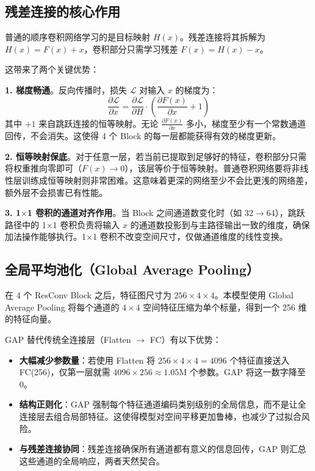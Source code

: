 \documentclass[12pt,a4paper]{ctexart}
\begin{document}
\subsection{残差连接的核心作用}

普通的顺序卷积网络学习的是目标映射 $H(x)$。残差连接将其拆解为 $H(x) = F(x) + x$，卷积部分只需学习残差 $F(x) = H(x) - x$。

这带来了两个关键优势：

\textbf{1. 梯度畅通}。反向传播时，损失 $\mathcal{L}$ 对输入 $x$ 的梯度为：
\[
\frac{\partial\mathcal{L}}{\partial x} = \frac{\partial\mathcal{L}}{\partial H} \cdot \left(\frac{\partial F(x)}{\partial x} + 1\right)
\]
其中 $+1$ 来自跳跃连接的恒等映射。无论 $\frac{\partial F(x)}{\partial x}$ 多小，梯度至少有一个常数通道回传，不会消失。这使得 4 个 Block 的每一层都能获得有效的梯度更新。

\textbf{2. 恒等映射保底}。对于任意一层，若当前已提取到足够好的特征，卷积部分只需将权重推向零即可（$F(x) \rightarrow 0$），该层等价于恒等映射。普通卷积网络要将非线性层训练成恒等映射则非常困难。这意味着更深的网络至少不会比更浅的网络差，额外层不会损害已有性能。

\textbf{3. 1$\times$1 卷积的通道对齐作用}。当 Block 之间通道数变化时（如 32$\rightarrow$64），跳跃路径中的 1$\times$1 卷积负责将输入 $x$ 的通道数投影到与主路径输出一致的维度，确保加法操作能够执行。1$\times$1 卷积不改变空间尺寸，仅做通道维度的线性变换。

\subsection{全局平均池化（Global Average Pooling）}

在 4 个 ResConv Block 之后，特征图尺寸为 $256 \times 4 \times 4$。本模型使用 Global Average Pooling 将每个通道的 $4\times4$ 空间特征压缩为单个标量，得到一个 256 维的特征向量。

GAP 替代传统全连接层（Flatten $\rightarrow$ FC）有以下优势：

\begin{itemize}
\item \textbf{大幅减少参数量}：若使用 Flatten 将 $256\times4\times4 = 4096$ 个特征直接送入 FC(256)，仅第一层就需 $4096 \times 256 \approx 1.05\text{M}$ 个参数。GAP 将这一数字降至 0。
\item \textbf{结构正则化}：GAP 强制每个特征通道编码类别级别的全局信息，而不是让全连接层去组合局部特征。这使得模型对空间平移更加鲁棒，也减少了过拟合风险。
\item \textbf{与残差连接协同}：残差连接确保所有通道都有意义的信息回传，GAP 则汇总这些通道的全局响应，两者天然契合。
\end{itemize}
\end{document}
